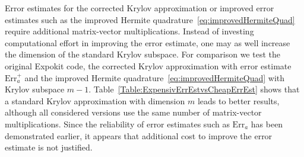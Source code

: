 \documentclass[smallextended]{svjour3pre}%
\numberwithin{equation}{section}
\numberwithin{figure}{section}
\numberwithin{table}{section}
\newcommand\Era{\mathrm{Err}_a}
\begin{document}
\begin{remark}\label{remark:cheapvsexpensive}
Error estimates for the corrected Krylov approximation or improved error estimates such as the improved Hermite quadrature~\eqref{eq:improvedHermiteQuad}
require additional matrix-vector multiplications.
Instead of investing computational effort in improving the error estimate,
one may as well increase the dimension of the standard Krylov subspace.
For comparison we test the original Expokit code, the corrected Krylov approximation with error estimate $\Era^+$
and the improved Hermite quadrature~\eqref{eq:improvedHermiteQuad} with Krylov subspace $m-1$.
Table~\ref{Table:ExpensivErrEstvsCheapErrEst} shows that a standard Krylov approximation with dimension $m$ leads to better results,
although all considered versions use the same number
of matrix-vector multiplications.
Since the reliability of error estimates such as $\Era$
has been demonstrated earlier,
it appears that additional cost to improve the error estimate
is not justified.


\end{remark}
\end{document}
